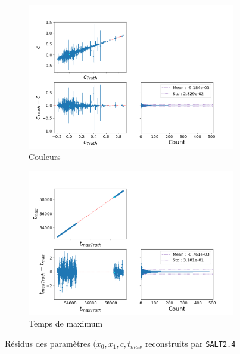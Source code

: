 \documentclass{book}
\def\saltd{\texttt{SALT2.4}\xspace}
\begin{document}
\begin{figure}[h]
\begin{subfigure}{0.45\textwidth}
		\label{fig:salt_x1}
	\end{subfigure}
	\hfill
	\begin{subfigure}{0.45\textwidth}
		\centering
		\includegraphics[width=\textwidth]{figures/salt_c.png}
		\caption{Couleurs}
		\label{fig:salt_c}
	\end{subfigure}
	\hfill
	\begin{subfigure}{0.45\textwidth}
		\centering
		\includegraphics[width=\textwidth]{figures/salt_tmax.png}
		\caption{Temps de maximum }
		\label{fig:salt_tmax}
	\end{subfigure}
	\caption{Résidus des paramètres $(x_0, x_1, c, t_{max}$ reconstruits par \saltd}
	\label{fig:salt_residuals}
\end{figure}
\end{document}
